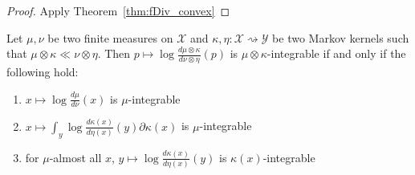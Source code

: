\begin{proof}
Apply Theorem~\ref{thm:fDiv_convex}
\end{proof}


\begin{lemma}
  \label{lem:integrable_llr_compProd_iff}
  \leanok
  \uses{}
  Let $\mu, \nu$ be two finite measures on $\mathcal X$ and $\kappa, \eta : \mathcal X \rightsquigarrow \mathcal Y$ be two Markov kernels such that $\mu \otimes \kappa \ll \nu \otimes \eta$. Then $p \mapsto \log \frac{d \mu \otimes \kappa}{d \nu \otimes \eta}(p)$ is $\mu \otimes \kappa$-integrable if and only if the following hold:
  \begin{enumerate}
    \item $x \mapsto \log \frac{d \mu}{d \nu}(x)$ is $\mu$-integrable \label{:1}
    \item $x \mapsto \int_y  \log \frac{d \kappa(x)}{d \eta(x)}(y) \partial \kappa(x)$ is $\mu$-integrable \label{:2}
    \item for $\mu$-almost all $x$, $y \mapsto \log \frac{d \kappa(x)}{d \eta(x)}(y)$ is $\kappa(x)$-integrable \label{:3}
  \end{enumerate}
\end{lemma}

